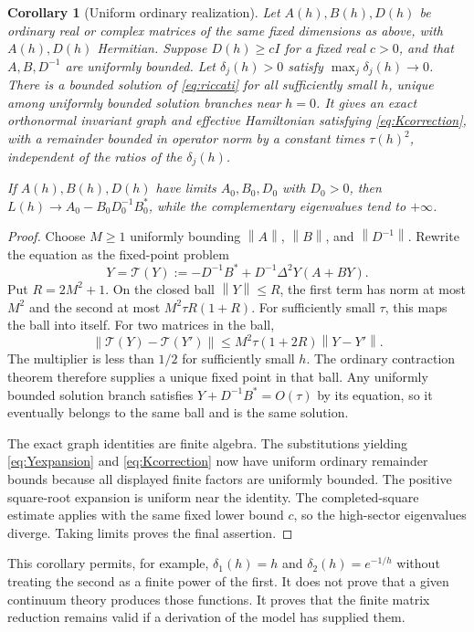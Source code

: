 \documentclass[11pt,oneside]{article}
\numberwithin{equation}{section}
\theoremstyle{plain}
\newtheorem{corollary}[theorem]{Corollary}
\theoremstyle{definition}
\theoremstyle{remark}
\newcommand{\norm}[1]{\left\|#1\right\|}
\begin{document}
\begin{corollary}[Uniform ordinary realization]\label{cor:realrealization}
Let $A(h),B(h),D(h)$ be ordinary real or complex matrices of the same fixed dimensions as above, with $A(h),D(h)$ Hermitian. Suppose $D(h)\ge cI$ for a fixed real $c>0$, and that $A,B,D^{-1}$ are uniformly bounded. Let $\delta_j(h)>0$ satisfy $\max_j\delta_j(h)\to0$. There is a bounded solution of \eqref{eq:riccati} for all sufficiently small $h$, unique among uniformly bounded solution branches near $h=0$. It gives an exact orthonormal invariant graph and effective Hamiltonian satisfying \eqref{eq:Kcorrection}, with a remainder bounded in operator norm by a constant times $\tau(h)^2$, independent of the ratios of the $\delta_j(h)$.

If $A(h),B(h),D(h)$ have limits $A_0,B_0,D_0$ with $D_0>0$, then $L(h)\to A_0-B_0D_0^{-1}B_0^*$, while the complementary eigenvalues tend to $+\infty$.
\end{corollary}
\begin{proof}
Choose $M\ge1$ uniformly bounding $\norm A$, $\norm B$, and $\norm{D^{-1}}$. Rewrite the equation as the fixed-point problem
\[
 Y=\mathcal T(Y):=-D^{-1}B^*+D^{-1}\Delta^2Y(A+BY).
\]
Put $R=2M^2+1$. On the closed ball $\norm Y\le R$, the first term has norm at most $M^2$ and the second at most
$M^2\tau R(1+R)$. For sufficiently small $\tau$, this maps the ball into itself. For two matrices in the ball,
\[
 \norm{\mathcal T(Y)-\mathcal T(Y')}
 \le M^2\tau(1+2R)\norm{Y-Y'}.
\]
The multiplier is less than $1/2$ for sufficiently small $h$. The ordinary contraction theorem therefore supplies a unique fixed point in that ball. Any uniformly bounded solution branch satisfies $Y+D^{-1}B^*=O(\tau)$ by its equation, so it eventually belongs to the same ball and is the same solution.

The exact graph identities are finite algebra. The substitutions yielding \eqref{eq:Yexpansion} and \eqref{eq:Kcorrection} now have uniform ordinary remainder bounds because all displayed finite factors are uniformly bounded. The positive square-root expansion is uniform near the identity. The completed-square estimate applies with the same fixed lower bound $c$, so the high-sector eigenvalues diverge. Taking limits proves the final assertion.
\end{proof}

This corollary permits, for example, $\delta_1(h)=h$ and $\delta_2(h)=e^{-1/h}$ without treating the second as a finite power of the first. It does not prove that a given continuum theory produces those functions. It proves that the finite matrix reduction remains valid if a derivation of the model has supplied them.
\end{document}
